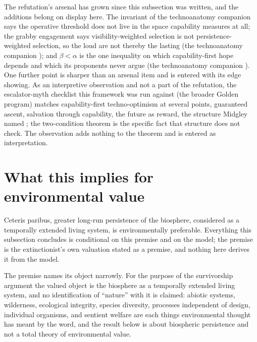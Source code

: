 The refutation's arsenal has grown since this subsection was written,
and the additions belong on display here. The invariant of
the technoanatomy companion \cite{GoldenTechnoanatomy} says the operative threshold does not
live in the space capability measures at all; the grabby engagement
says visibility-weighted selection is not persistence-weighted
selection, so the loud are not thereby the lasting
(the technoanatomy companion \cite{GoldenTechnoanatomy}); and $\beta<\alpha$ is the one
inequality on which capability-first hope depends and which its
proponents never argue (the technoanatomy companion \cite{GoldenTechnoanatomy}). One further
point is sharper than an arsenal item and is entered with its edge
showing. As an interpretive observation and not a part of the refutation, the
escalator-myth checklist this framework was run against
(the broader Golden program) matches capability-first techno-optimism
at several points, guaranteed ascent, salvation through capability,
the future as reward, the structure Midgley named \cite{Midgley85};
the two-condition theorem is the specific fact that structure does not
check. The observation adds nothing to the theorem and is entered as
interpretation.


\section{What this implies for environmental value}\label{sec:environment}

\label{hr:sub:environment}

\begin{premise}\label{hr:prem:env}
Ceteris paribus, greater long-run persistence of the biosphere,
considered as a temporally extended living system, is environmentally
preferable. Everything this subsection concludes is conditional on this
premise and on the model; the premise is the extinctionist's own
valuation stated as a premise, and nothing here derives it from the
model.
\end{premise}

\noindent The premise names its object narrowly. For the purpose of the
survivorship argument the valued object is the biosphere as a
temporally extended living system, and no identification of ``nature''
with it is claimed: abiotic systems, wilderness, ecological integrity,
species diversity, processes independent of design, individual
organisms, and sentient welfare are each things environmental thought
has meant by the word, and the result below is about biospheric
persistence and not a total theory of environmental value.

